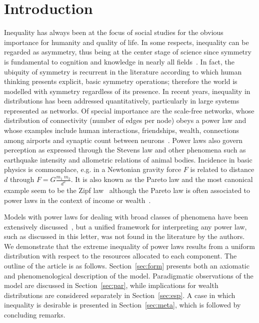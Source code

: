 \documentclass[10pt,letterpaper]{article}
\begin{document}
\linenumbers

\section*{Introduction}
Inequality has always been at the focus of social studies for the obvious importance for humanity and quality of life.
In some respects, inequality can be regarded as asymmetry, thus being at the center stage of science since symmetry is fundamental to cognition and knowledge in nearly all fields~\cite{deleuze,part}.
In fact, the ubiquity of symmetry is recurrent in the literature according to which human thinking presents explicit, basic symmetry operations; therefore the world is modelled with symmetry regardless of its presence.
In recent years, inequality in distributions has been addressed quantitatively, particularly in large systems represented as networks.
Of special importance are the scale-free networks, whose distribution of connectivity (number of edges per node) obeys a power law
and whose
examples include human interactions, friendships, wealth, 
connections among airports and synaptic count between neurons~\cite{newman}.
Power laws also govern perception as expressed through the Stevens law
and other phenomena such as
earthquake intensity and allometric relations of animal bodies.
Incidence in basic physics is commonplace, e.g. in a Newtonian gravity force $F$ is related to distance $d$ through
$F=G\frac{m_1\;m_2}{d^2}$.
It is also known as the Pareto law and the most canonical example seem to be the Zipf law~\cite{newmanpower}
although the Pareto law is often associated to power laws in the context of income or wealth~\cite{lada,economics}.

Models with power laws for dealing with broad classes of phenomena have been extensively discussed~\cite{part,pbook},
but a unified framework for interpreting any power law, such as discussed in this letter, was not found in the literature by the authors.
We demonstrate that the extreme inequality of power laws results from a uniform distribution with respect to the resources allocated to each component.
The outline of the article is as follows.
Section~\ref{sec:form} presents both an axiomatic and phenomenological description of the model.
Paradigmatic observations of the model are discussed in Section~\ref{sec:par},
while implications for wealth distributions are considered separately in Section~\ref{sec:esp}.
A case in which inequality is desirable is presented in Section~\ref{sec:meta}, which is followed by concluding remarks.
\end{document}
